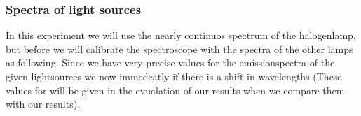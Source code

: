 \subsubsection{Spectra of light sources}
In this experiment we will use the nearly continuos spectrum of
the halogenlamp, but before we will calibrate the spectroscope
with the spectra of the other lamps as following.
Since we have very precise values for the emissionspectra of 
the given lightsources \cite{nist} we now immedeatly if
there is a shift in wavelengths (These values for will be given
in the evualation of our results when we compare them with our
results).


